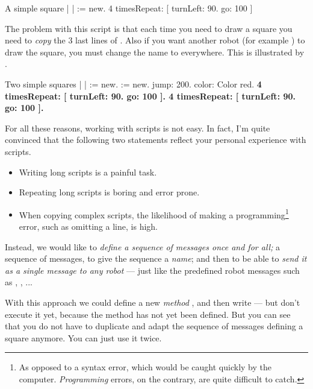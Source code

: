 \begin{scriptwithtitle}{A simple square}\label{src:againSquare}
| \caro |
\caro := \Turtle new.
4 timesRepeat: 
         [ \caro turnLeft: 90.
         \caro go: 100 ]
\end{scriptwithtitle}

The problem with this script is that each time you need to draw a square
you need to \emph{copy} the 3 last lines of .  
Also if you want another robot (for example \daly) to draw the square, you must 
change the name \caro to \daly everywhere. This is illustrated by .

\begin{scriptwithtitle}{Two simple squares}\label{src:againSquare2}
| \caro \daly |
\caro := \Turtle new.
\daly := \Turtle new.
\daly jump: 200.
\daly color: Color red.
\textbf{
4 timesRepeat: 
         [ \caro turnLeft: 90.
         \caro go: 100 ].
4 timesRepeat: 
         [ \daly turnLeft: 90.
         \daly go: 100 ].}
\end{scriptwithtitle}

For all these reasons, working with scripts is not easy. In fact, I'm quite convinced that the following two statements reflect your personal experience with scripts.

\begin{itemize}
\item Writing long scripts is a painful task.
\item Repeating long scripts is boring and error prone. 
\item When copying complex scripts, the likelihood of making a
programming\footnote{As opposed to a syntax error, which would be
caught quickly by the computer. \emph{Programming} errors, on the
contrary, are quite difficult to catch.}  error, such as omitting a
line, is high.
\end{itemize}

Instead, we would like to \emph{define a sequence of messages once and for all;} a sequence of messages, to give the sequence a \emph{name}; and then to be able to \emph{send it as a single message to any robot} --- just like the predefined robot messages such as \go, \north, \jump... 
         
         
With this approach we could define a new \emph{method} , and 
then write  --- but don't execute it 
yet, because the method  has not yet been defined.  But you can see that you do not have to duplicate and adapt the sequence of messages defining a square anymore. You can just use it twice.


